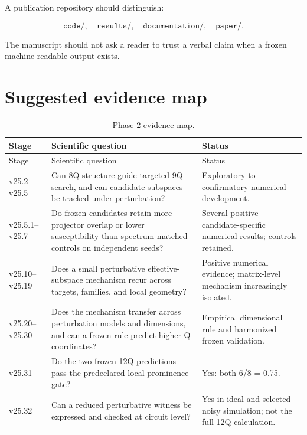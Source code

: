 \documentclass[11pt,a4paper]{article}
\begin{document}
A publication repository should distinguish:

\[
\texttt{code/},\quad
\texttt{results/},\quad
\texttt{documentation/},\quad
\texttt{paper/}.
\]

The manuscript should not ask a reader to trust a verbal claim when a frozen
machine-readable output exists.

\section{Suggested evidence map}

\begin{longtable}{@{}p{}p{}p{}@{}}
\caption{Phase-2 evidence map.}\\
\toprule
Stage & Scientific question & Status\\
\midrule
\endfirsthead
\toprule
Stage & Scientific question & Status\\
\midrule
\endhead

v25.2--v25.5 &
Can 8Q structure guide targeted 9Q search, and can candidate subspaces be
tracked under perturbation? &
Exploratory-to-confirmatory numerical development.\\

v25.5.1--v25.7 &
Do frozen candidates retain more projector overlap or lower susceptibility
than spectrum-matched controls on independent seeds? &
Several positive candidate-specific numerical results; controls retained.\\

v25.10--v25.19 &
Does a small perturbative effective-subspace mechanism recur across targets,
families, and local geometry? &
Positive numerical evidence; matrix-level mechanism increasingly isolated.\\

v25.20--v25.30 &
Does the mechanism transfer across perturbation models and dimensions, and can
a frozen rule predict higher-Q coordinates? &
Empirical dimensional rule and harmonized frozen validation.\\

v25.31 &
Do the two frozen 12Q predictions pass the predeclared local-prominence gate? &
Yes: both 6/8 = 0.75.\\

v25.32 &
Can a reduced perturbative witness be expressed and checked at circuit level? &
Yes in ideal and selected noisy simulation; not the full 12Q calculation.\\


\end{longtable}
\end{document}
